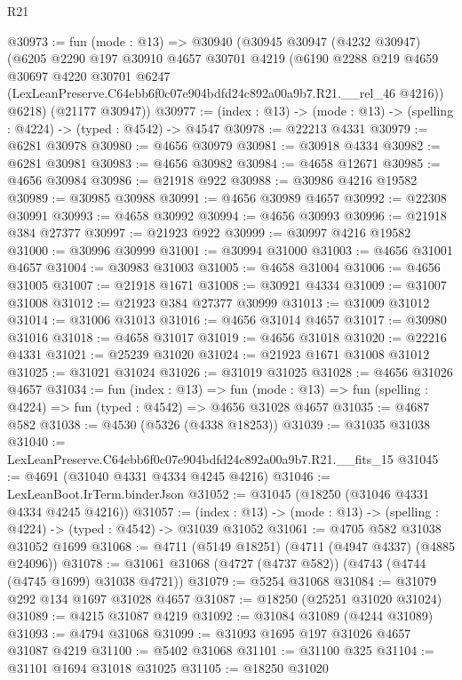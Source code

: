 \begin{lexlean}{R21}
\begin{coremodule}
@30973 := fun (mode : @13) =>
  @30940
    (@30945
      @30947
      (@4232 @30947)
      (@6205
        @2290
        @197
        @30910
        @4657
        @30701
        @4219
        (@6190
          @2288
          @219
          @4659
          @30697
          @4220
          @30701
          @6247
          (LexLeanPreserve.C64ebb6f0c07e904bdfd24c892a00a9b7.R21.__rel_46 @4216))
        @6218)
      (@21177 @30947))
@30977 := (index : @13) -> (mode : @13) -> (spelling : @4224) -> (typed : @4542) -> @4547
@30978 := @22213 @4331
@30979 := @6281 @30978
@30980 := @4656 @30979
@30981 := @30918 @4334
@30982 := @6281 @30981
@30983 := @4656 @30982
@30984 := @4658 @12671
@30985 := @4656 @30984
@30986 := @21918 @922
@30988 := @30986 @4216 @19582
@30989 := @30985 @30988
@30991 := @4656 @30989 @4657
@30992 := @22308 @30991
@30993 := @4658 @30992
@30994 := @4656 @30993
@30996 := @21918 @384 @27377
@30997 := @21923 @922
@30999 := @30997 @4216 @19582
@31000 := @30996 @30999
@31001 := @30994 @31000
@31003 := @4656 @31001 @4657
@31004 := @30983 @31003
@31005 := @4658 @31004
@31006 := @4656 @31005
@31007 := @21918 @1671
@31008 := @30921 @4334
@31009 := @31007 @31008
@31012 := @21923 @384 @27377 @30999
@31013 := @31009 @31012
@31014 := @31006 @31013
@31016 := @4656 @31014 @4657
@31017 := @30980 @31016
@31018 := @4658 @31017
@31019 := @4656 @31018
@31020 := @22216 @4331
@31021 := @25239 @31020
@31024 := @21923 @1671 @31008 @31012
@31025 := @31021 @31024
@31026 := @31019 @31025
@31028 := @4656 @31026 @4657
@31034 := fun (index : @13) =>
  fun (mode : @13) => fun (spelling : @4224) => fun (typed : @4542) => @4656 @31028 @4657
@31035 := @4687 @582
@31038 := @4530 (@5326 (@4338 @18253))
@31039 := @31035 @31038
@31040 := LexLeanPreserve.C64ebb6f0c07e904bdfd24c892a00a9b7.R21.__fits_15
@31045 := @4691 (@31040 @4331 @4334 @4245 @4216)
@31046 := LexLeanBoot.IrTerm.binderJson
@31052 := @31045 (@18250 (@31046 @4331 @4334 @4245 @4216))
@31057 := (index : @13) -> (mode : @13) -> (spelling : @4224) -> (typed : @4542) -> @31039 @31052
@31061 := @4705 @582 @31038 @31052 @1699
@31068 := @4711 (@5149 @18251) (@4711 (@4947 @4337) (@4885 @24096))
@31078 := @31061 @31068 (@4727 (@4737 @582)) (@4743 (@4744 (@4745 @1699) @31038 @4721))
@31079 := @5254 @31068
@31084 := @31079 @292 @134 @1697 @31028 @4657
@31087 := @18250 (@25251 @31020 @31024)
@31089 := @4215 @31087 @4219
@31092 := @31084 @31089 (@4244 @31089)
@31093 := @4794 @31068
@31099 := @31093 @1695 @197 @31026 @4657 @31087 @4219
@31100 := @5402 @31068
@31101 := @31100 @325
@31104 := @31101 @1694 @31018 @31025
@31105 := @18250 @31020

\end{coremodule}
\end{lexlean}
